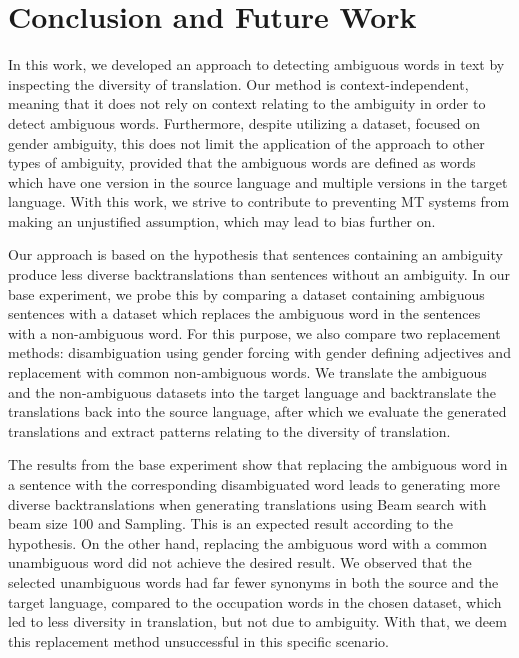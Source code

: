 \chapter{Conclusion and Future Work}
\label{ch:Conclusion}

In this work, we developed an approach to detecting ambiguous words in text by inspecting the diversity of translation. Our method is context-independent, meaning that it does not rely on context relating to the ambiguity in order to detect ambiguous words. Furthermore, despite utilizing a dataset, focused on gender ambiguity, this does not limit the application of the approach to other types of ambiguity, provided that the ambiguous words are defined as words which have one version in the source language and multiple versions in the target language. With this work, we strive to contribute to preventing MT systems from making an unjustified assumption, which may lead to bias further on.

Our approach is based on the hypothesis that sentences containing an ambiguity produce less diverse backtranslations than sentences without an ambiguity. In our base experiment, we probe this by comparing a dataset containing ambiguous sentences with a dataset which replaces the ambiguous word in the sentences with a non-ambiguous word. For this purpose, we also compare two replacement methods: disambiguation using gender forcing with gender defining adjectives and replacement with common non-ambiguous words. We translate the ambiguous and the non-ambiguous datasets into the target language and backtranslate the translations back into the source language, after which we evaluate the generated translations and extract patterns relating to the diversity of translation.

The results from the base experiment show that replacing the ambiguous word in a sentence with the corresponding disambiguated word leads to generating more diverse backtranslations when generating translations using Beam search with beam size 100 and Sampling. This is an expected result according to the hypothesis. On the other hand, replacing the ambiguous word with a common unambiguous word did not achieve the desired result. We observed that the selected unambiguous words had far fewer synonyms in both the source and the target language, compared to the occupation words in the chosen dataset, which led to less diversity in translation, but not due to ambiguity. With that, we deem this replacement method unsuccessful in this specific scenario. 

